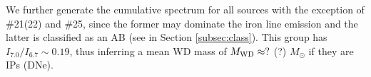 \documentclass[fleqn,usenatbib]{mnras}
\begin{document}
We further generate the cumulative spectrum for all sources with the exception of \#21(22) and \#25, since the former may dominate the iron line emission and the latter is classified as an AB (see in Section \ref{subsec:class}).
This group has $I_{7.0}/I_{6.7} \sim 0.19$, 
thus inferring a mean WD mass of $M_{\rm WD} \approx ?$ (?) $M_\odot$ if they are IPs (DNe).
\end{document}
